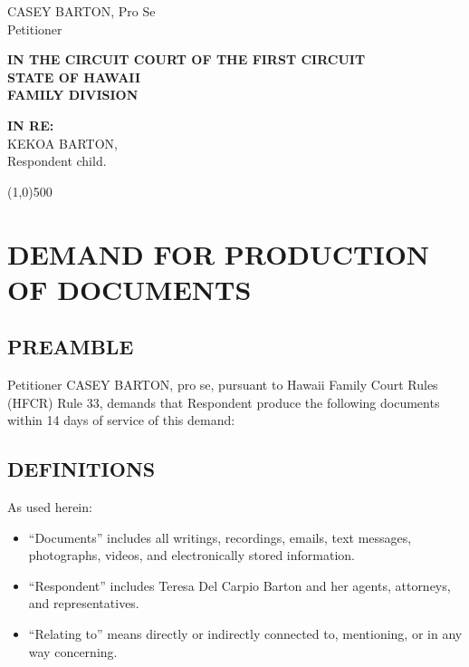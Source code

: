 \documentclass[11pt,letter]{article}
\begin{document}
\noindent
\begin{flushright}
CASEY BARTON, Pro Se \\  
Petitioner \\[0.3cm]
\end{flushright}

\begin{center}
\textbf{IN THE CIRCUIT COURT OF THE FIRST CIRCUIT} \\
\textbf{STATE OF HAWAII} \\
\textbf{FAMILY DIVISION}
\end{center}

\begin{flushleft}
\textbf{IN RE:} \\[0.2cm]
KEKOA BARTON, \\[0.2cm]
\hspace{1cm} Respondent child. 
\end{flushleft}

\vspace{0.5cm}
\line(1,0){500}
\vspace{0.5cm}

\section*{DEMAND FOR PRODUCTION OF DOCUMENTS}

\subsection*{PREAMBLE}

Petitioner CASEY BARTON, pro se, pursuant to Hawaii Family Court Rules (HFCR) Rule 33, demands that Respondent produce the following documents within 14 days of service of this demand:

\subsection*{DEFINITIONS}

As used herein:
\begin{itemize}
\item ``Documents'' includes all writings, recordings, emails, text messages, photographs, videos, and electronically stored information.
\item ``Respondent'' includes Teresa Del Carpio Barton and her agents, attorneys, and representatives.
\item ``Relating to'' means directly or indirectly connected to, mentioning, or in any way concerning.
\end{itemize}
\end{document}
